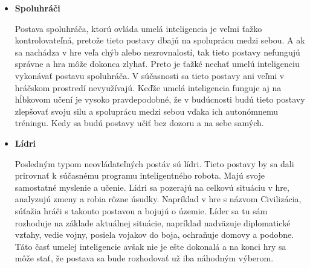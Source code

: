 \documentclass[10pt,twoside,slovak,a4paper]{article}
\begin{document}
\begin{itemize}
\item \textbf{Spoluhráči}

 Postava spoluhráča, ktorú ovláda umelá inteligencia je veľmi ťažko kontrolovateľná, pretože tieto postavy dbajú na spoluprácu medzi sebou. A ak sa nachádza v hre veľa chýb alebo nezrovnalostí, tak tieto postavy nefungujú správne a hra môže dokonca zlyhať. Preto je ťažké nechať umelú inteligenciu vykonávať postavu spoluhráča. V súčasnosti sa tieto postavy ani veľmi v hráčskom prostredí nevyužívajú. Keďže umelá inteligencia funguje aj na hĺbkovom učení je vysoko pravdepodobné, že v budúcnosti budú tieto postavy zlepšovať svoju silu a spoluprácu medzi sebou vďaka ich autonómnemu tréningu. Kedy sa budú postavy učiť bez dozoru a na sebe samých.  \cite{Types}

\item \textbf{Lídri}

 Posledným typom neovládateľných postáv sú lídri. Tieto postavy by sa dali prirovnať k súčasnému programu inteligentného robota. Majú svoje samostatné myslenie a učenie. Lídri sa pozerajú na celkovú situáciu v hre, analyzujú zmeny a robia rôzne úsudky. Napríklad v hre s názvom Civilizácia, súťažia hráči s takouto postavou a bojujú o územie. Líder sa tu sám rozhoduje na základe aktuálnej situácie, napríklad nadväzuje diplomatické vzťahy, vedie vojny, posiela vojakov do boja, ochraňuje domovy a podobne. Táto časť umelej inteligencie avšak nie je ešte dokonalá a na konci hry sa môže stať, že postava sa bude rozhodovať už iba náhodným výberom.  \cite{Types}

\end{itemize}
\end{document}
